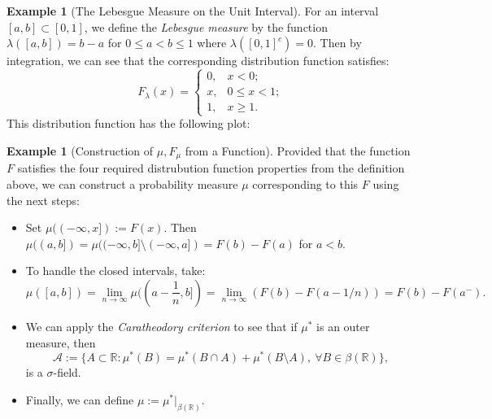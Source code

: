 \documentclass[12pt,reqno]{article}
\renewcommand{\emph}[1]{\textit{#1}}
\theoremstyle{plain}
\theoremstyle{definition}
\newtheorem{example}[theorem]{Example}
\begin{document}
\begin{example}[The Lebesgue Measure on the Unit Interval]
For an interval $[a,b] \subset [0,1]$, we define the 
\emph{Lebesgue measure} by the function 
$\lambda([a,b]) = b-a$ for $0 \leq a < b \leq 1$ where 
$\lambda([0,1]^c) = 0$. Then by integration, we can see that the 
corresponding distribution function satisfies:
\[
F_{\lambda}(x) = \begin{cases} 
     0, & x < 0; \\ 
     x, & 0 \leq x < 1; \\ 
     1, & x \geq 1. 
     \end{cases} 
\]
This distribution function has the following plot: 
\begin{center}
\end{center} 
\end{example} 

\begin{example}[Construction of $\mu,F_{\mu}$ from a Function]
Provided that the function $F$ satisfies the four required distrubution 
function properties from the definition above, we can construct a 
probability measure $\mu$ corresponding to this $F$ using the next steps:
\begin{itemize} 

\item Set $\mu((-\infty,x]) := F(x)$. Then 
$\mu((a,b]) = \mu((-\infty,b] \setminus (-\infty,a]) = F(b) - F(a)$ for 
$a < b$. 
\item To handle the closed intervals, take:
\[
\mu([a,b]) = \lim_{n \rightarrow \infty} \mu((a-\frac{1}{n},b]) = 
     \lim_{n \rightarrow \infty} (F(b) - F(a-1/n)) = F(b) - F(a^{-}). 
\]
\item We can apply the \emph{Caratheodory criterion} to see that if 
     $\mu^{\ast}$ is an outer measure, then 
     \[
     \mathcal{A} := \{A \subset \mathbb{R}: \mu^{\ast}(B) = 
     \mu^{\ast}(B \cap A) + \mu^{\ast}(B \setminus A),\ \forall 
     B \in \beta(\mathbb{R})\}, 
     \]
     is a $\sigma$-field. 
\item Finally, we can define 
     $\mu := \mu^{\ast} \Bigr\rvert_{\beta(\mathbb{R})}$. 

\end{itemize}
\end{example} 
\end{document}
